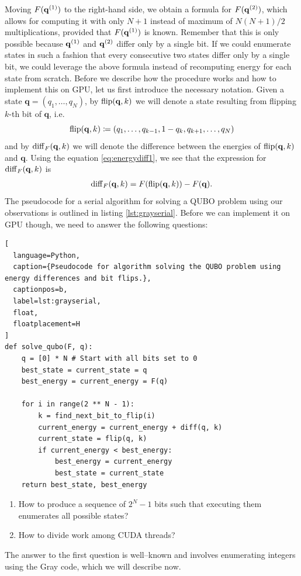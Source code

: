 Moving $F(\mathbf{q}^{(1)})$ to the right-hand side, we obtain a formula for $F(\mathbf{q}^{(2)})$,
which allows for computing it with only $N+1$ instead of maximum of $N(N+1)/2$
multiplications, provided that $F(\mathbf{q}^{(1)})$ is known. Remember that this is only
possible because $\mathbf{q}^{(1)}$ and $\mathbf{q}^{(2)}$ differ only by a single bit. If we could
enumerate states in such a fashion that every consecutive two states differ
only by a single bit, we could leverage the above formula instead of
recomputing energy for each state from scratch. Before we describe how the
procedure works and how to implement this on GPU, let us first introduce the
necessary notation. Given a state $\mathbf{q} = (q_{1},\ldots,q_{N})$, by
$\operatorname*{flip}(\mathbf{q},k)$ we will denote a state resulting from flipping $k$-th
bit of $\mathbf{q}$, i.e.
\begin{equation}
  \operatorname*{flip}(\mathbf{q},k) \coloneq (q_{1}, \ldots, q_{k-1}, 1-q_{k}, q_{k+1}, \ldots, q_{N})
\end{equation}
and by $\operatorname{diff}_{F}(\mathbf{q},k)$ we will denote the difference between the
energies of $\operatorname*{flip}(\mathbf{q},k)$ and $\mathbf{q}$. Using the equation
\eqref{eq:energydiff1}, we see that the expression for
$\operatorname{diff}_{F}(\mathbf{q},k)$ is
\begin{align}
  \begin{split}
    \operatorname{diff}_{F}(\mathbf{q},k) = F(\operatorname*{flip}(\mathbf{q},k)) - F(\mathbf{q}).
  \end{split}
\end{align}
The pseudocode for a serial algorithm for solving a QUBO problem using our
observations is outlined in listing \ref{lst:grayserial}. Before we can
implement it on GPU though, we need to answer the following questions:
\begin{lstlisting}[
  language=Python,
  caption={Pseudocode for algorithm solving the QUBO problem using energy differences and bit flips.},
  captionpos=b,
  label=lst:grayserial,
  float,
  floatplacement=H
]
def solve_qubo(F, q):
    q = [0] * N # Start with all bits set to 0
    best_state = current_state = q
    best_energy = current_energy = F(q)

    for i in range(2 ** N - 1):
        k = find_next_bit_to_flip(i)
        current_energy = current_energy + diff(q, k)
        current_state = flip(q, k)
        if current_energy < best_energy:
            best_energy = current_energy
            best_state = current_state
    return best_state, best_energy
\end{lstlisting}
\begin{enumerate}
  \item How to produce a sequence of $2^{N}-1$ bits such that executing them enumerates
    all possible states?
  \item How to divide work among CUDA threads?
\end{enumerate}
The answer to the first question is well--known and involves enumerating
integers using the Gray code, which we will describe now.


